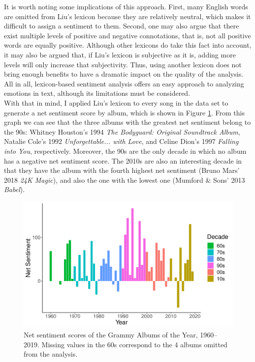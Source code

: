 \documentclass{article}
\begin{document}
It is worth noting some implications of this approach. First, many English words are omitted from Liu's lexicon because they are relatively neutral, which makes it difficult to assign a sentiment to them. Second, one may also argue that there exist multiple levels of positive and negative connotations, that is, not all positive words are equally positive. Although other lexicons do take this fact into account, it may also be argued that, if Liu's lexicon is subjective as it is, adding more levels will only increase that subjectivity. Thus, using another lexicon does not bring enough benefits to have a dramatic impact on the quality of the analysis. All in all, lexicon-based sentiment analysis offers an easy approach to analyzing emotions in text, although its limitations must be considered. \\



With that in mind, I applied Liu's lexicon to every song in the data set to generate a net sentiment score by album, which is shown in Figure \ref{fig:annual_sentiment}. From this graph we can see that the three albums with the greatest net sentiment belong to the 90s: Whitney Houston's 1994 \textit{The Bodyguard: Original Soundtrack Album}, Natalie Cole's 1992 \textit{Unforgettable... with Love}, and Celine Dion's 1997 \textit{Falling into You}, respectively. Moreover, the 90s are the only decade in which no album has a negative net sentiment score. The 2010s are also an interesting decade in that they have the album with the fourth highest net sentiment (Bruno Mars' 2018 \textit{24K Magic}), and also the one with the lowest one (Mumford \& Sons' 2013 \textit{Babel}).


\begin{figure}[h]
    \centering
    \includegraphics[scale=0.5]{Plots/graph_annual_sentiment.pdf}
    \caption{Net sentiment scores of the Grammy Albums of the Year, 1960--2019. Missing values in the 60s correspond to the 4 albums omitted from the analysis.}
    \label{fig:annual_sentiment}
\end{figure}
\end{document}

